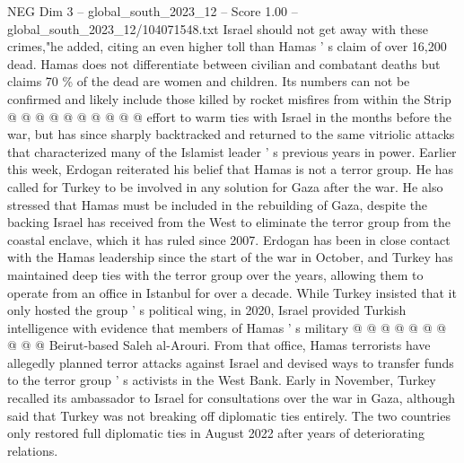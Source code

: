 \begin{textsample}{NEG Dim 3 – global\_south\_2023\_12 – Score 1.00 – global\_south\_2023\_12/104071548.txt}
Israel should not get away with these crimes,"he added, citing an even higher toll than Hamas ' s claim of over 16,200 dead.
Hamas does not differentiate between civilian and combatant deaths but claims 70 \% of the dead are women and children.
Its numbers can not be confirmed and likely include those killed by rocket misfires from within the Strip @ @ @ @ @ @ @ @ @ @ effort to warm ties with Israel in the months before the war, but has since sharply backtracked and returned to the same vitriolic attacks that characterized many of the Islamist leader ' s previous years in power.
Earlier this week, Erdogan reiterated his belief that Hamas is not a terror group.
He has called for Turkey to be involved in any solution for Gaza after the war.
He also stressed that Hamas must be included in the rebuilding of Gaza, despite the backing Israel has received from the West to eliminate the terror group from the coastal enclave, which it has ruled since 2007.
Erdogan has been in close contact with the Hamas leadership since the start of the war in October, and Turkey has maintained deep ties with the terror group over the years, allowing them to operate from an office in Istanbul for over a decade.
While Turkey insisted that it only hosted the group ' s political wing, in 2020, Israel provided Turkish intelligence with evidence that members of Hamas ' s military @ @ @ @ @ @ @ @ @ @ Beirut-based Saleh al-Arouri.
From that office, Hamas terrorists have allegedly planned terror attacks against Israel and devised ways to transfer funds to the terror group ' s activists in the West Bank.
Early in November, Turkey recalled its ambassador to Israel for consultations over the war in Gaza, although said that Turkey was not breaking off diplomatic ties entirely.
The two countries only restored full diplomatic ties in August 2022 after years of deteriorating relations.

\end{textsample}

